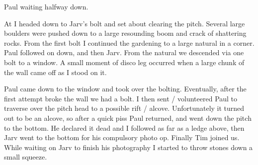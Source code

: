     \begin{marginfigure}
\checkoddpage \ifoddpage \forcerectofloat \else \forceversofloat \fi
\centering
 \caption{Paul waiting halfway down. }
 \label{dangermouse}
\end{marginfigure}

At  I headed down to Jarv's bolt and set about clearing the pitch. Several large boulders were pushed down to a large resounding boom and crack of shattering rocks. From the first bolt I continued the gardening to a large natural in a corner. Paul followed on
down, and then Jarv. From the natural we descended via one bolt to a window. A small moment of disco leg occurred when a large chunk of the wall came off as I stood on it.

Paul came down to the window and took over the bolting. Eventually, after the first attempt broke the wall we had a bolt. I then sent / volunteered Paul to traverse over the pitch head to a possible rift / alcove. Unfortunately it turned out to be an alcove, so after a quick piss Paul returned, and went down the pitch to the bottom. He declared it dead and I followed as far as a ledge above, then Jarv went to the bottom for his compulsory photo op. Finally Tim joined us. While waiting on Jarv to finish his photography I started to throw stones down a small squeeze.

